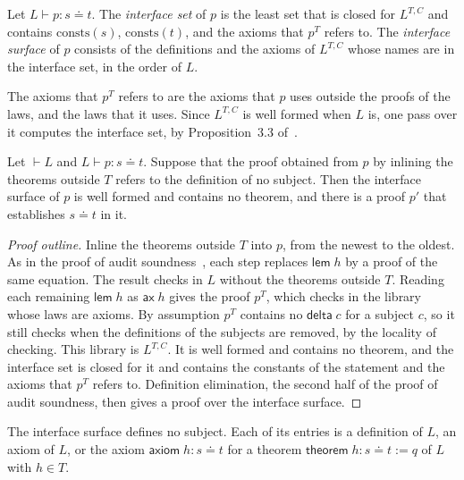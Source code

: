 \documentclass[acmsmall,nonacm,screen]{acmart}
\newcommand{\eqd}{\doteq}
\newcommand{\kw}[1]{\mathsf{#1}}
\newcommand{\chk}[4]{#1 \vdash #2 : #3 \eqd #4}
\newcommand{\wf}[1]{\vdash #1}
\newcommand{\consts}{\mathrm{consts}}
\newcommand{\view}[1]{#1^{T,C}}
\begin{document}
\begin{definition}
\label{def:iface}
Let $\chk{L}{p}{s}{t}$. The \emph{interface set} of $p$ is the least set that is closed for
$\view{L}$ and contains $\consts(s)$, $\consts(t)$, and the axioms that $p^T$ refers to. The
\emph{interface surface} of $p$ consists of the definitions and the axioms of $\view{L}$ whose
names are in the interface set, in the order of $L$.
\end{definition}

The axioms that $p^T$ refers to are the axioms that $p$ uses outside the proofs of the laws,
and the laws that it uses. Since $\view{L}$ is well formed when $L$ is, one pass over it computes
the interface set, by Proposition~3.3 of~\citet{tpp1}.

\begin{theorem}
\label{thm:iface}
Let $\wf{L}$ and $\chk{L}{p}{s}{t}$. Suppose that the proof obtained from $p$ by inlining the
theorems outside $T$ refers to the definition of no subject. Then the interface surface of $p$
is well formed and contains no theorem, and there is a proof $p'$ that establishes $s \eqd t$ in
it.
\end{theorem}

\begin{proof}[Proof outline]
Inline the theorems outside $T$ into $p$, from the newest to the oldest. As in the proof of
audit soundness~\citep{tpp1}, each step replaces $\kw{lem}\;h$ by a proof of the same equation.
The result checks in $L$ without the theorems outside $T$. Reading each remaining $\kw{lem}\;h$
as $\kw{ax}\;h$ gives the proof $p^T$, which checks in the library whose laws are axioms. By
assumption $p^T$ contains no $\kw{delta}\;c$ for a subject $c$, so it still checks when the
definitions of the subjects are removed, by the locality of checking. This library is $\view{L}$.
It is well formed and contains no theorem, and the interface set is closed for it and contains
the constants of the statement and the axioms that $p^T$ refers to. Definition elimination, the
second half of the proof of audit soundness, then gives a proof over the interface surface.
\end{proof}

\begin{proposition}
\label{prop:entries}
The interface surface defines no subject. Each of its entries is a definition of $L$, an axiom of
$L$, or the axiom $\kw{axiom}\;h : s \eqd t$ for a theorem $\kw{theorem}\;h : s \eqd t := q$ of
$L$ with $h \in T$.
\end{proposition}
\end{document}
